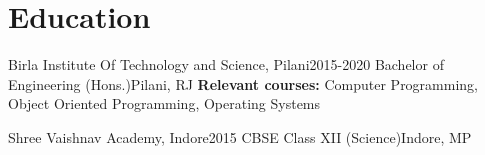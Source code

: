 \section{Education}
  \resumeSubHeadingListStart
    \resumeSubheading
      {Birla Institute Of Technology and Science, Pilani}{2015-2020}
      {Bachelor of Engineering (Hons.)}{Pilani, RJ}
      \vspace{-8pt}\resumeSubSubheading
            {\footnotesize\textnormal{\textbf{Relevant courses:} Computer Programming, Object Oriented Programming, Operating Systems}}{}
  \resumeSubHeadingListEnd

  \vspace{-8pt}
  
  \resumeSubHeadingListStart
    \resumeSubheading
      {Shree Vaishnav Academy, Indore}{2015}
      {CBSE Class XII (Science)}{Indore, MP}
  \resumeSubHeadingListEnd
